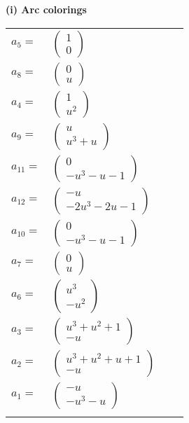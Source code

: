 \documentclass[1p]{elsarticle_modified}
\theoremstyle{definition}
\begin{document}
\flushleft \textbf{(i) Arc colorings}\\
\begin{tabular}{m{7pt} m{180pt} m{7pt} m{180pt} }
\flushright $a_{5}=$&$\begin{pmatrix}1\\0\end{pmatrix}$ \\
\flushright $a_{8}=$&$\begin{pmatrix}0\\u\end{pmatrix}$ \\
\flushright $a_{4}=$&$\begin{pmatrix}1\\u^2\end{pmatrix}$ \\
\flushright $a_{9}=$&$\begin{pmatrix}u\\u^3+u\end{pmatrix}$ \\
\flushright $a_{11}=$&$\begin{pmatrix}0\\- u^3- u-1\end{pmatrix}$ \\
\flushright $a_{12}=$&$\begin{pmatrix}- u\\-2 u^3-2 u-1\end{pmatrix}$ \\
\flushright $a_{10}=$&$\begin{pmatrix}0\\- u^3- u-1\end{pmatrix}$ \\
\flushright $a_{7}=$&$\begin{pmatrix}0\\u\end{pmatrix}$ \\
\flushright $a_{6}=$&$\begin{pmatrix}u^3\\- u^2\end{pmatrix}$ \\
\flushright $a_{3}=$&$\begin{pmatrix}u^3+u^2+1\\- u\end{pmatrix}$ \\
\flushright $a_{2}=$&$\begin{pmatrix}u^3+u^2+u+1\\- u\end{pmatrix}$ \\
\flushright $a_{1}=$&$\begin{pmatrix}- u\\- u^3- u\end{pmatrix}$\\&\end{tabular}
\end{document}
